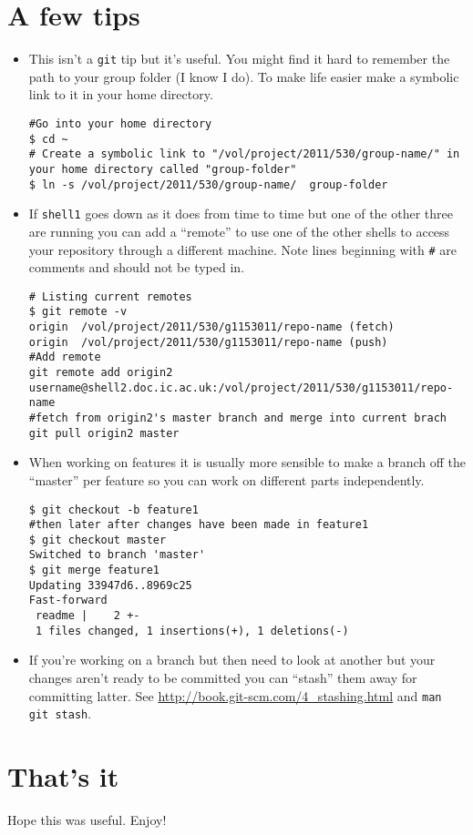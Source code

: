 \documentclass[a4paper,10pt,fleqn]{article}
\begin{document}
\section{A few tips}
\begin{itemize}
	\item This isn't a \texttt{git} tip but it's useful. You might find it hard to remember the path to your group folder (I know I do). To make life easier make a symbolic link to it in your home directory.
\begin{lstlisting}
#Go into your home directory
$ cd ~
# Create a symbolic link to "/vol/project/2011/530/group-name/" in your home directory called "group-folder"
$ ln -s /vol/project/2011/530/group-name/  group-folder
\end{lstlisting}


	\item If \texttt{shell1} goes down as it does from time to time but one of the other three are running you can add a ``remote'' to use one of the other shells to access your repository through a different machine. Note lines beginning with \texttt{\#} are comments and should not be typed in.
	\begin{lstlisting}
# Listing current remotes
$ git remote -v
origin  /vol/project/2011/530/g1153011/repo-name (fetch)                                                                                                                                                                                                                       
origin  /vol/project/2011/530/g1153011/repo-name (push) 
#Add remote
git remote add origin2 username@shell2.doc.ic.ac.uk:/vol/project/2011/530/g1153011/repo-name
#fetch from origin2's master branch and merge into current brach
git pull origin2 master
	\end{lstlisting}
	
	\item
	When working on features it is usually more sensible to make a branch off the ``master'' per feature so you can work on different parts independently.
\begin{lstlisting}
$ git checkout -b feature1
#then later after changes have been made in feature1
$ git checkout master
Switched to branch 'master'
$ git merge feature1
Updating 33947d6..8969c25
Fast-forward
 readme |    2 +-
 1 files changed, 1 insertions(+), 1 deletions(-)
\end{lstlisting}

	\item If you're working on a branch but then need to look at another but your changes aren't ready to be committed you can ``stash'' them away for committing latter. See \url{http://book.git-scm.com/4_stashing.html} and \texttt{man git stash}. 

\end{itemize}


\section{That's it}
Hope this was useful. Enjoy!
\end{document}
